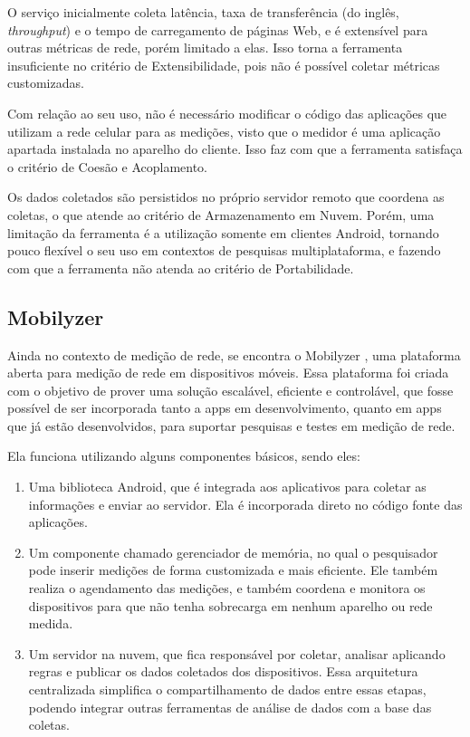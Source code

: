 \documentclass[12pt]{tcc}
\begin{document}
	O serviço inicialmente coleta latência, taxa de transferência (do inglês, \emph{throughput}) e o tempo de carregamento de páginas Web, e é extensível para outras métricas de rede, porém limitado a elas. Isso torna a ferramenta insuficiente no critério de Extensibilidade, pois não é possível coletar métricas customizadas. 

	Com relação ao seu uso, não é necessário modificar o código das aplicações que utilizam a rede celular para as medições, visto que o medidor é uma aplicação apartada instalada no aparelho do cliente. Isso faz com que a ferramenta satisfaça o critério de Coesão e Acoplamento. 

	Os dados coletados são persistidos no próprio servidor remoto que coordena as coletas, o que atende ao critério de Armazenamento em Nuvem. Porém, uma limitação da ferramenta é a utilização somente em clientes Android, tornando pouco flexível o seu uso em contextos de pesquisas multiplataforma, e fazendo com que a ferramenta não atenda ao critério de Portabilidade.

	\subsection{Mobilyzer}
	\par Ainda no contexto de medição de rede, se encontra o Mobilyzer \citep{Nikravesh2015Mobilyzer}, uma plataforma aberta para medição de rede em dispositivos móveis. Essa plataforma foi criada com o objetivo de prover uma solução escalável, eficiente e controlável, que fosse possível de ser incorporada tanto a apps em desenvolvimento, quanto em apps que já estão desenvolvidos, para suportar pesquisas e testes em medição de rede. 
	\par Ela funciona utilizando alguns componentes básicos, sendo eles: 
	\begin{enumerate}
		\item Uma biblioteca Android, que é integrada aos aplicativos para coletar as informações e enviar ao servidor. Ela é incorporada direto no código fonte das aplicações.
		\item Um componente chamado gerenciador de memória, no qual o pesquisador pode inserir medições de forma customizada e mais eficiente. Ele também realiza o agendamento das medições, e também coordena e monitora os dispositivos para que não tenha sobrecarga em nenhum aparelho ou rede medida. 
		\item Um servidor na nuvem, que fica responsável por coletar, analisar aplicando regras e publicar os dados coletados dos dispositivos. Essa arquitetura centralizada simplifica o compartilhamento de dados entre essas etapas, podendo integrar outras ferramentas de análise de dados com a base das coletas.

	\end{enumerate}
\end{document}
